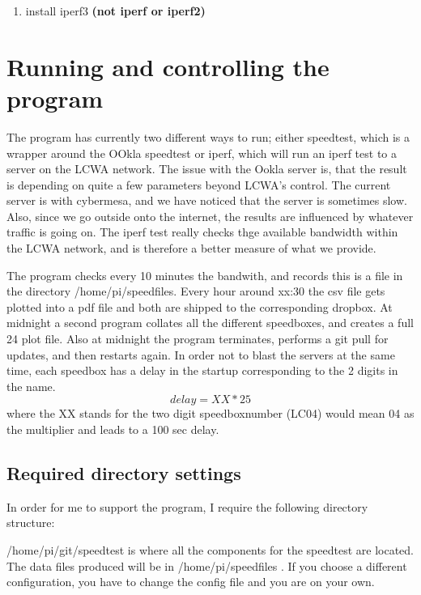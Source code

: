 \documentclass[12pt]{article}
\begin{document}
\begin{enumerate}
\item install iperf3 \textbf{(not iperf or iperf2)}
\end{enumerate}



\section{Running and controlling the program}

The program has currently two different ways to run; either speedtest, which is a wrapper around the OOkla speedtest  or iperf, which will run an iperf test to a server on the LCWA network. The issue with the Ookla server is, that the result is depending on quite a few parameters beyond LCWA's control. The current server is with cybermesa,
and we have noticed that the server is sometimes slow. Also, since we go outside onto the internet, the results are  influenced by whatever traffic is going on. The iperf test really checks thge available bandwidth within the LCWA network, and is therefore a better measure of what we provide.

The program checks every 10 minutes the bandwith, and records this is a file in the directory /home/pi/speedfiles. Every hour around xx:30 the csv file gets plotted into a pdf file and both are shipped to the corresponding dropbox.
At midnight a second program collates all the different speedboxes, and creates a full 24 plot file. Also at midnight the program terminates, performs a git pull for updates, and then restarts again. In order not to blast the servers at the same time, each speedbox has a delay in the startup corresponding to the 2 digits in the name.
\begin{equation}
delay = XX*25
\end{equation}
where the XX stands for the two digit speedboxnumber (LC04) would mean 04  as the multiplier and leads to a 100 sec delay.

\subsection{Required directory settings}

In order for me to support the program, I require the following directory structure:

/home/pi/git/speedtest is where all the components for the speedtest are located. The data files produced will be in /home/pi/speedfiles . If you choose a different configuration, you have to change the config file and you are on your own.
 
\end{document}
